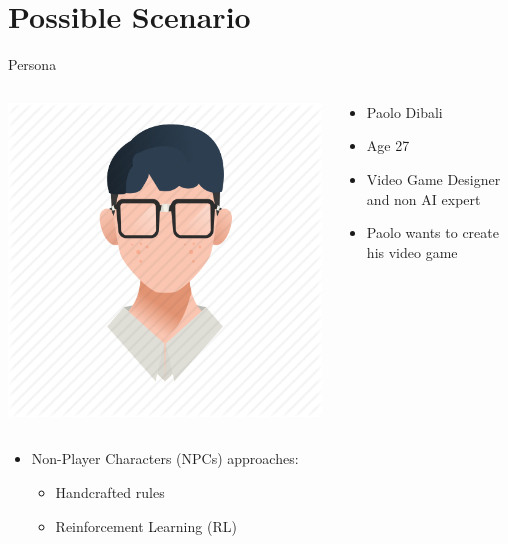 \section{Possible Scenario}


\begin{frame}{Persona}
	\begin{columns}
		
		\begin{column}{0.5\textwidth}
			\centering
			\includegraphics[width=0.6\linewidth]{images/paolo.png}			
		\end{column}
		
		\begin{column}{0.5\textwidth}
			
			\begin{itemize}
				\item Paolo Dibali
				\item Age 27
				\item Video Game Designer and non AI expert
				\item Paolo wants to create his video game
			\end{itemize}
			
		\end{column}
		
	\end{columns}
	
	\vspace{0.5cm}
	
	\begin{itemize}
		\item Non-Player Characters (NPCs) approaches:
		\begin{itemize}
			\item Handcrafted rules 
			\item Reinforcement Learning (RL)
		\end{itemize}
	\end{itemize}
	
\end{frame}

